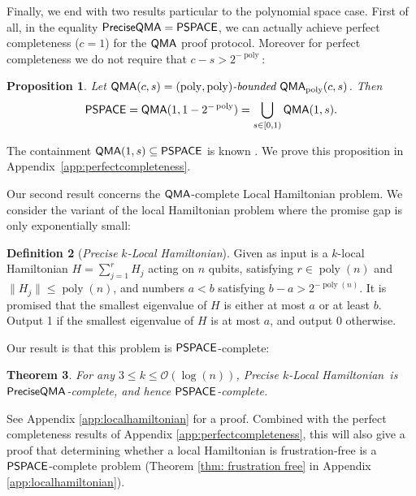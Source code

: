 \documentclass[11pt]{article}
\newtheorem{theorem}{Theorem}
\newtheorem{proposition}[theorem]{Proposition}
\theoremstyle{definition}
\newtheorem{definition}[theorem]{Definition}
\theoremstyle{remark}
\newcommand\QMA{{\sf{QMA}}}
\newcommand\PSPACE{{\sf{PSPACE}}}
\newcommand\QMAexp{{\sf{PreciseQMA}}}
\newcommand\bddQMA[5]{{\left(#1,#2\right)}\textit{-bounded }\QMA_{#3}(#4,#5)}
\newcommand\preciseklh{\textit{Precise }$k$\textit{-Local Hamiltonian}}
\newcommand\spechamiltonian[1]{#1\textit{-Matrix Eigenvalue}}
\DeclareMathOperator{\poly}{poly}
\begin{document}
Finally, we end with two results particular to the polynomial space case. First of all, in the equality $\QMAexp=\PSPACE$, we can actually achieve perfect completeness ($c=1$) for the $\QMA$ proof protocol. Moreover for perfect completeness we do not require that $c-s > 2^{-\poly}$:
\begin{proposition} \label{prop: perfect completeness} Let $\QMA(c,s) = \bddQMA{\poly}{\poly}{\poly}{c}{s}$. Then
\[
\PSPACE = \QMA(1,1-2^{-\poly}) = \bigcup_{s \in [0,1)}\QMA(1,s).
\]
\end{proposition}
The containment $\QMA(1,s) \subseteq \PSPACE$ is known \cite{ikw12}. We prove this proposition in Appendix~\ref{app:perfectcompleteness}.

Our second result concerns the $\QMA$-complete Local Hamiltonian problem. We consider the variant of the local Hamiltonian problem where the promise gap is only exponentially small: 
\begin{definition}[\preciseklh]\label{def: precise local hamiltonian}
Given as input is a $k$-local Hamiltonian $H=\sum_{j=1}^rH_j$ acting on $n$ qubits, satisfying $r \in \poly(n)$ and $\|H_j\| \le \poly(n)$, and numbers $a < b$ satisfying $b - a > 2^{-\poly(n)}$. It is promised that the smallest eigenvalue of $H$ is either at most $a$ or at least $b$. Output 1 if the smallest eigenvalue of $H$ is at most $a$, and output 0 otherwise.
\end{definition}
Our result is that this problem is $\PSPACE$-complete:
\begin{theorem} \label{thm: precise local hamiltonian}
For any $3 \le k \le \mathcal{O}(\log(n))$, \preciseklh \ is $\QMAexp$-complete, and hence $\PSPACE$-complete.
\end{theorem}
See Appendix \ref{app:localhamiltonian} for a proof. Combined with the perfect completeness results of Appendix \ref{app:perfectcompleteness}, this will also give a proof that determining whether a local Hamiltonian is frustration-free is a $\PSPACE$-complete problem (Theorem \ref{thm: frustration free} in Appendix \ref{app:localhamiltonian}).
\end{document}

